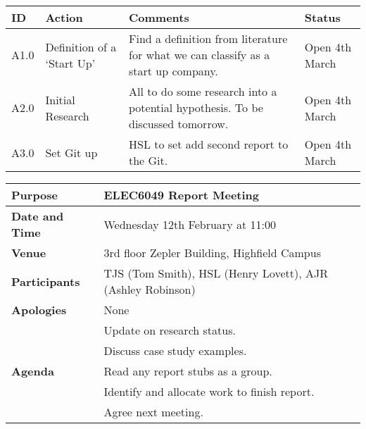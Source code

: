 \begin{center}
\begin{longtable}{| p{} | >{\raggedright\arraybackslash}p{} |  p{} | >{\raggedright\arraybackslash}p{}|} \hline
\textbf{ID} & \textbf{Action} & \textbf{Comments} & \textbf{Status} \\ \hline
\endhead
A1.0	&	Definition of a `Start Up'	&	Find a definition from literature for what we can classify as a start up company.	& Open 4th March \\ \hline
A2.0	&	Initial Research	&	All to do some research into a potential hypothesis. To be discussed tomorrow.	&	Open 4th March \\ \hline
A3.0	&	Set Git up	&	HSL to set add second report to the Git.	&	Open 4th March	\\ \hline	
\end{longtable}
\end{center}



{}
\begin{center}
\begin{longtable}{| m{} | m{} |} \hline
\textbf{Purpose} & ELEC6049 Report Meeting \\ \hline
\textbf{Date and Time} & Wednesday 12th February at 11:00 \\ \hline
\textbf{Venue} & 3rd floor Zepler Building, Highfield Campus \\ \hline
\textbf{Participants} & TJS (Tom Smith), HSL (Henry Lovett), AJR (Ashley Robinson)\\ \hline
\textbf{Apologies} & None \\ \hline
\multirow{5}{*}{\textbf{Agenda}} & Update on research status. \\
 & Discuss case study examples. \\ 
 & Read any report stubs as a group. \\
 & Identify and allocate work to finish report. \\ 
 & Agree next meeting. \\ \hline
\end{longtable}
\end{center}

